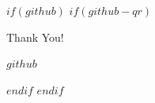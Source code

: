 \documentclass[aspectratio=169]{beamer}
\begin{document}
$if(github)$
$if(github-qr)$

\begin{frame}[plain]
  \begin{center}

    \vfill

    {
     Thank You!\par}

    \vspace{1em}


    \vspace{1em}

    {\small
     \href{$github$}{\texttt{$github$}}\par}

    \vfill

  \end{center}
\end{frame}

$endif$
$endif$
\end{document}
